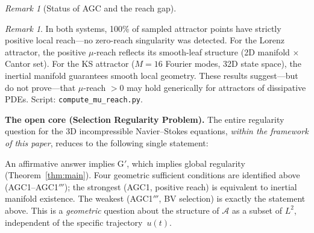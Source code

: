 \documentclass[12pt,a4paper]{article}
\theoremstyle{definition}
\theoremstyle{plain}
\theoremstyle{remark}
\newtheorem{remark}[definition]{Remark}
\begin{document}
\begin{remark}[Status of AGC and the reach gap]
\begin{remark}
In both systems, 100\% of sampled attractor points have strictly positive
local reach---no zero-reach singularity was detected.
For the Lorenz attractor, the positive $\mu$-reach reflects its
smooth-leaf structure (2D manifold $\times$ Cantor set).
For the KS attractor ($M = 16$ Fourier modes, 32D state space),
the inertial manifold guarantees smooth local geometry.
These results suggest---but do not prove---that $\mu$-reach $> 0$
may hold generically for attractors of dissipative PDEs.
Script: \texttt{compute\_mu\_reach.py}.
\end{remark}

\medskip\noindent
\textbf{The open core (Selection Regularity Problem).}\;
The entire regularity question for the 3D incompressible Navier--Stokes
equations, \emph{within the framework of this paper}, reduces to the
following single statement:

\begin{center}
\end{center}

\noindent
An affirmative answer implies G$'$, which implies global regularity
(Theorem~\ref{thm:main}). Four geometric sufficient conditions are
identified above (AGC1--AGC1$'''$); the strongest (AGC1, positive reach)
is equivalent to inertial manifold existence. The weakest
(AGC1$'''$, BV selection) is exactly the statement above.
This is a \emph{geometric} question about the structure of
$\mathcal{A}$ as a subset of $L^2$, independent of the specific
trajectory~$u(t)$.


\end{remark}
\end{document}
